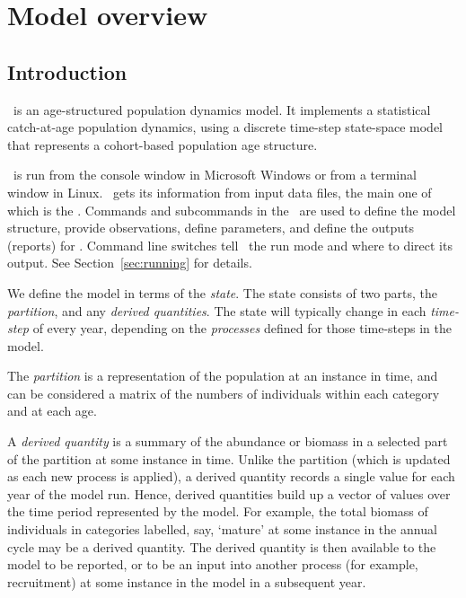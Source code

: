 \section{Model overview\label{sec:overview}}

\subsection{Introduction}

\CNAME\ is an age-structured population dynamics model. It implements a statistical catch-at-age population dynamics, using a discrete time-step state-space model that represents a cohort-based population age structure.  

\CNAME\ is run from the console window in Microsoft Windows or from a terminal window in Linux. \CNAME\ gets its information from input data files, the main one of which is the \emph{\config}. Commands and subcommands in the \config\ are used to define the model structure, provide observations, define parameters, and define the outputs (reports) for \CNAME. Command line switches tell \CNAME\ the run mode and where to direct its output. See Section~\ref{sec:running} for details.

We define the model in terms of the \emph{state}. The state consists of two parts, the \emph{partition}, and any \emph{derived quantities}. The state will typically change in each \emph{time-step} of every year, depending on the \emph{processes} defined for those time-steps in the model. 

The \emph{partition} is a representation of the population at an instance in time, and can be considered a matrix of the numbers of individuals within each category and at each age. 

A \emph{derived quantity} is a summary of the abundance or biomass in a selected part of the partition at some instance in time. Unlike the partition (which is updated as each new process is applied), a derived quantity records a single value for each year of the model run. Hence, derived quantities build up a vector of values over the time period represented by the model. For example, the total biomass of individuals in categories labelled, say, `mature' at some instance in the annual cycle may be a derived quantity. The derived quantity is then available to the model to be reported, or to be an input into another process (for example, recruitment) at some instance in the model in a subsequent year. 


